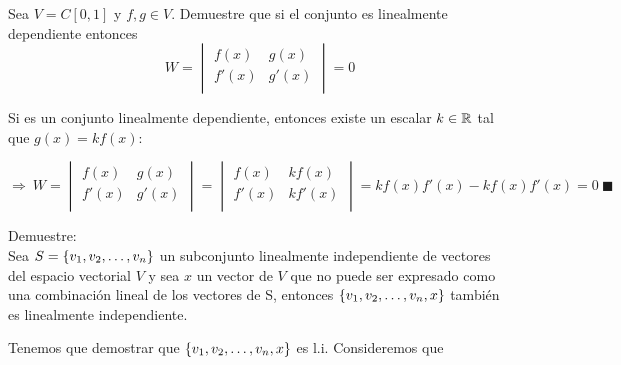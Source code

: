 \begin{enumerate}

\begin{prob}
Sea $V=C[0,1]$ y $f, g \in V$. Demuestre que si el conjunto  es linealmente dependiente entonces
\[W=
\begin{vmatrix}
f(x)&g(x)\\
f'(x)&g'(x)\\
\end{vmatrix}=0
\]
\end{prob}
\sol
Si  es un conjunto linealmente dependiente, entonces existe un escalar $k\in \mathbb{R}$ tal que $g(x)=kf(x)$:

\[\Rightarrow\
W=
\begin{vmatrix}
f(x)&g(x)\\
f'(x)&g'(x)\\
\end{vmatrix}
=
\begin{vmatrix}
f(x)&kf(x)\\
f'(x)&kf'(x)\\
\end{vmatrix}
=
kf(x)f'(x)-kf(x)f'(x)=0
\ \blacksquare\]

\begin{prob}
Demuestre:
\\Sea $S= \lbrace v_1, v_2, \ldots, v_n \rbrace$ un subconjunto linealmente independiente de vectores del espacio vectorial $V$ y sea $x$ un vector de $V$ que no puede ser expresado como una combinación lineal de los vectores de S, entonces $ \left\{ v_1, v_2, \ldots, v_n, x \right\} $
también es linealmente independiente.
\end{prob}

\sol
Tenemos que demostrar que $ \left\{ v_1, v_2, \ldots, v_n, x \right\} $ es l.i.
Consideremos que


\end{enumerate}
